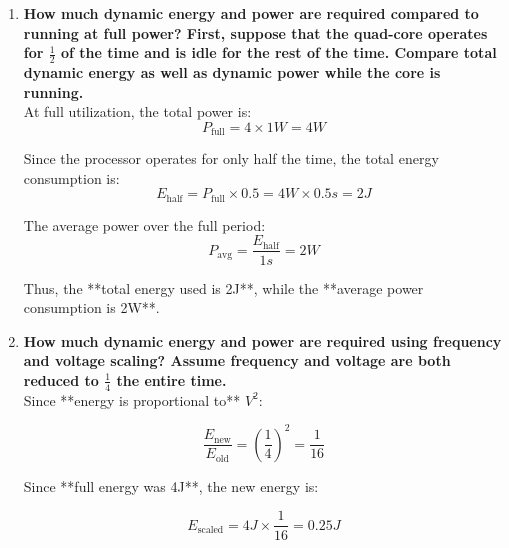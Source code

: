 \begin{enumerate}
          \begin{enumerate}
              \item \textbf{How much dynamic energy and power are required compared to running at full power? First, suppose that the quad-core operates for $\frac{1}{2}$ of the time and is idle for the rest of the time. Compare total dynamic energy as well as dynamic power while the core is running.} \\
                    At full utilization, the total power is:
                    \begin{equation*}
                        P_{\text{full}} = 4 \times 1W = 4W
                    \end{equation*}

                    Since the processor operates for only half the time, the total energy consumption is:
                    \begin{equation*}
                        E_{\text{half}} = P_{\text{full}} \times 0.5 = 4W \times 0.5s = 2J
                    \end{equation*}

                    The average power over the full period:
                    \begin{equation*}
                        P_{\text{avg}} = \frac{E_{\text{half}}}{1s} = 2W
                    \end{equation*}

                    Thus, the **total energy used is 2J**, while the **average power consumption is 2W**.

              \item \textbf{How much dynamic energy and power are required using frequency and voltage scaling? Assume frequency and voltage are both reduced to $\frac{1}{4}$ the entire time.} \\
                    Since **energy is proportional to** $V^2$:

                    \begin{equation*}
                        \frac{E_{\text{new}}}{E_{\text{old}}} = \left(\frac{1}{4}\right)^2 = \frac{1}{16}
                    \end{equation*}

                    Since **full energy was 4J**, the new energy is:

                    \begin{equation*}
                        E_{\text{scaled}} = 4J \times \frac{1}{16} = 0.25J
                    \end{equation*}


\end{enumerate}
\end{enumerate}
